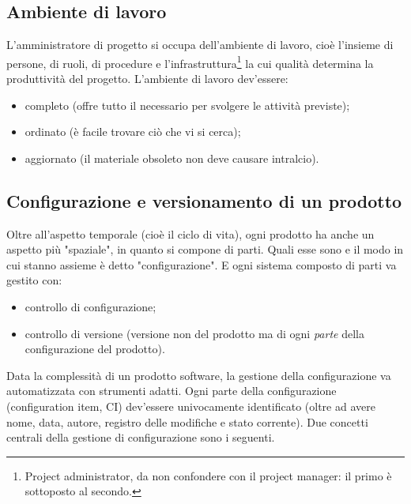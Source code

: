 \documentclass[a4paper]{article}
\begin{document}
		
	\subsection{Ambiente di lavoro}

		
L'amministratore di progetto si occupa dell'ambiente di lavoro, cioè l'insieme di persone, di ruoli, di procedure e l'infrastruttura\footnote{Project administrator, da non confondere con il project manager: il primo è sottoposto al secondo.} la cui qualità determina la produttività del progetto. L'ambiente di lavoro dev'essere:
		
	\begin{itemize}
		
			
	\item completo (offre tutto il necessario per svolgere le attività previste);
			
	\item ordinato (è facile trovare ciò che vi si cerca);
			
	\item aggiornato (il materiale obsoleto non deve causare intralcio).
		
	\end{itemize}


		
	\subsection{Configurazione e versionamento di un prodotto}

		
Oltre all'aspetto temporale (cioè il ciclo di vita), ogni prodotto ha anche un aspetto più "spaziale", in quanto si compone di parti. Quali esse sono e il modo in cui stanno assieme è detto "configurazione". E ogni sistema composto di parti va gestito con:
		
	\begin{itemize}
		
			
	\item controllo di configurazione;
			
	\item controllo di versione (versione non del prodotto ma di ogni \emph{parte} della configurazione del prodotto).
		
	\end{itemize}

		
Data la complessità di un prodotto software, la gestione della configurazione va automatizzata con strumenti adatti. Ogni parte della configurazione (configuration item, CI) dev'essere univocamente identificato (oltre ad avere nome, data, autore, registro delle modifiche e stato corrente). Due concetti centrali della gestione di configurazione sono i seguenti.
		
\end{document}
